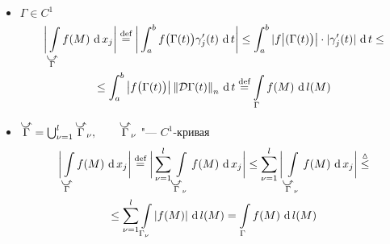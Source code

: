 \begin{eproof}
	\item
	\begin{itemize}
		\item $ \Gamma \in C^1 $
		\begin{multline*}
			\bigg| \cint[x_j]{\curvedir\Gamma}{f(M)} \bigg| \bydef \bigg| \dint[t]ab{f \big( \Gamma(t) \big)\gamma_j'(t)} \bigg| \le \dint[t]ab{|f \big| ( \Gamma(t) \big) \big| \cdot |\gamma_j'(t)|} \le \\
			\le \dint[t]ab{ \big| f \big( \Gamma(t) \big) \big| \norm{\mc D \Gamma(t)}_n} \bydef \cint\Gamma{f(M)}
		\end{multline*}
		\item $ \curvedir\Gamma = \bigcup_{\nu = 1}^l \curvedir\Gamma_\nu, \qquad \curvedir\Gamma_\nu $ "--- $ C^1 $-кривая
		\begin{multline*}
			\bigg| \cint[x_j]{\curvedir\Gamma}{f(M)} \bigg| \bydef \bigg| \sum_{\nu = 1}^l \cint[x_j]{\curvedir\Gamma_\nu}{f(M)} \bigg| \le \sum_{\nu = 1}^l \bigg| \cint[x_j]{\curvedir\Gamma_\nu}{f(M)} \bigg| \trile \\
			\le \sum_{\nu = 1}^l \cint{\Gamma_\nu}{|f(M)|} = \cint\Gamma{f(M)}
		\end{multline*}
	\end{itemize}
\end{eproof}
